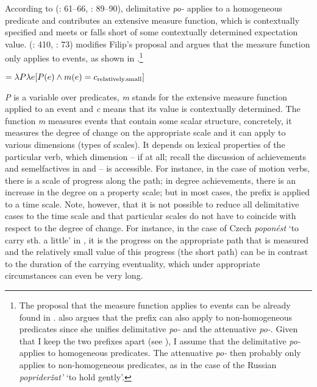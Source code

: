 \documentclass[output=paper,colorlinks,citecolor=brown]{langscibook}
\begin{document}
\largerpage[-1]
According to \citeauthor{bis:Filip2000} (\citeyear{bis:Filip2000}: 61--66, \citeyear{Filip2003}: 89--90), delimitative \textit{po-} applies to a homogeneous predicate and contributes an extensive measure function, which is contextually specified and meets or falls short of some contextually determined expectation value. \citeauthor{Souckova2004b} (\citeyear{Souckova2004b}: 410, \citeyear{Souckova2004a}: 73) modifies Filip’s proposal and argues that the measure function only applies to events, as shown in .\footnote{The proposal that the measure function applies to events can be already found in \citet[362--363]{Pinon1994}. \citet{Souckova2004b, Souckova2004a} also argues that the prefix can also apply to non-homogeneous predicates since she unifies delimitative \textit{po-} and the attenuative \textit{po-}. Given that I keep the two prefixes apart (see ), I assume that the delimitative \textit{po-} applies to homogeneous predicates. The attenuative \textit{po-} then probably only applies to non-homogeneous predicates, as in the case of the Russian \textit{poprideržat'} ‘to hold gently’.}

\ea\label{biskup:ex:relsmall}
 $= \lambda P \lambda e [P(e) \wedge m(e) =
 c\textsubscript{relatively.small}]$
\z

\noindent \textit{P} is a variable over predicates, \textit{m} stands for the extensive measure function applied to an event and \textit{c} means that its value is contextually determined. The function \textit{m} measures events that contain some scalar structure, concretely, it measures the degree of change on the appropriate scale and it can apply to various dimensions (types of scales). It depends on lexical properties of the particular verb, which dimension -- if at all; recall the discussion of achievements and semelfactives in  and  -- is accessible. For instance, in the case of motion verbs, there is a scale of progress along the path; in degree achievements, there is an increase in the degree on a property scale; but in most cases, the prefix is applied to a time scale. Note, however, that it is not possible to reduce all delimitative cases to the time scale and that particular scales do not have to coincide with respect to the degree of change. For instance, in the case of Czech \textit{poponést} ‘to carry sth. a little’ in , it is the progress on the appropriate path that is measured and the relatively small value of this progress (the short path) can be in contrast to the duration of the carrying eventuality, which under appropriate circumstances can even be very long.
\end{document}
